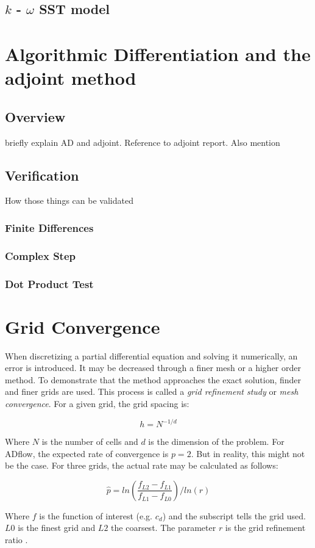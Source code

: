 \subsection{$k$ - $\omega$ SST model}




\section{Algorithmic Differentiation and the adjoint method}
\subsection{Overview}
briefly explain AD and adjoint. Reference to adjoint report. Also mention  


\subsection{Verification}
How those things can be validated 
\subsubsection{Finite Differences}
\subsubsection{Complex Step}
\subsubsection{Dot Product Test}




\section{Grid Convergence}
When discretizing a partial differential equation and solving it numerically,
an error is introduced. It may be decreased through a finer mesh or a higher
order method. To demonstrate that the method approaches the exact solution,
finder and finer grids are used. This process is called a \textit{grid
refinement study} or \textit{mesh convergence}. For a given grid, the grid
spacing is:

\begin{equation}
  h = N^{-1/d}
\end{equation}

\noindent Where $N$ is the number of cells and $d$ is the dimension of the
problem.
For ADflow, the expected rate of convergence is $p=2$. But in reality, this
might not be the case. For three grids, the actual rate may be calculated as
follows:

\begin{equation}
  \hat p = ln(\frac{f_{L2} - f_{L1}}{f_{L1} - f_{L0}}) / ln(r)
  \label{eq:conv_rate}
\end{equation}

\noindent Where $f$ is the function of interest (e.g. $c_{d}$) and the subscript
tells the grid used. $L0$ is the finest grid and $L2$ the coarsest. The
parameter $r$ is the grid refinement ratio .\cite{grid_refinement}
